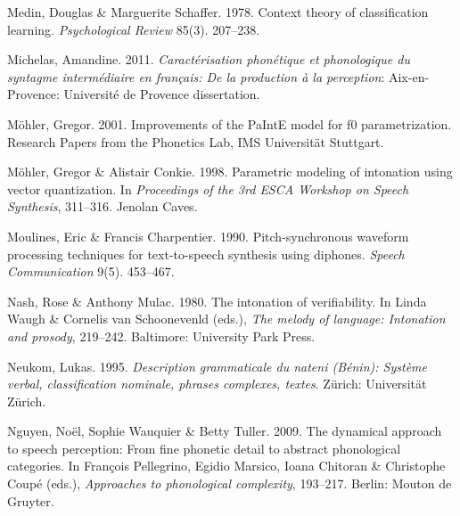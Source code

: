 \documentclass[ number=1
,series=labphon
,output=long
,url=http://langsci-press.org/catalog/book/16
,isbn=978-3-944675-01-5
]{LSP/langsci}
\begin{document}
\begin{thebibliography}{284}
Medin, Douglas \& Marguerite Schaffer. 1978.
\newblock Context theory of classification learning.
\newblock \emph{Psychological Review} 85(3). 207--238.

Michelas, Amandine. 2011.
\newblock \emph{Caract\'{e}risation phon\'{e}tique et phonologique du syntagme
  interm\'{e}diaire en fran\c{c}ais: {D}e la production \`{a} la perception}:
  Aix-en-Provence: Universit\'{e} de Provence dissertation.

M{\"o}hler, Gregor. 2001.
\newblock Improvements of the {PaIntE} model for f0 parametrization.
\newblock Research Papers from the Phonetics Lab, IMS Universit\"{a}t
  Stuttgart.

M{\"o}hler, Gregor \& Alistair Conkie. 1998.
\newblock Parametric modeling of intonation using vector quantization.
\newblock In \emph{Proceedings of the 3rd {ESCA Workshop on Speech Synthesis}},
  311--316. Jenolan Caves.

Moulines, Eric \& Francis Charpentier. 1990.
\newblock Pitch-synchronous waveform processing techniques for text-to-speech
  synthesis using diphones.
\newblock \emph{Speech Communication} 9(5). 453--467.

Nash, Rose \& Anthony Mulac. 1980.
\newblock The intonation of verifiability.
\newblock In Linda Waugh \& Cornelis {van Schoonevenld} (eds.), \emph{The
  melody of language: {I}ntonation and prosody}, 219--242. Baltimore:
  University Park Press.

Neukom, Lukas. 1995.
\newblock \emph{Description grammaticale du nateni ({B}{\'e}nin): {S}yst{\`e}me
  verbal, classification nominale, phrases complexes, textes}.
\newblock Z\"{u}rich: Universit\"{a}t Z\"{u}rich.

Nguyen, Noël, Sophie Wauquier \& Betty Tuller. 2009.
\newblock The dynamical approach to speech perception: {F}rom fine phonetic
  detail to abstract phonological categories.
\newblock In François Pellegrino, Egidio Marsico, Ioana Chitoran \& Christophe
  Coup{\'e} (eds.), \emph{Approaches to phonological complexity}, 193--217.
  Berlin: Mouton de Gruyter.


\end{thebibliography}
\end{document}
